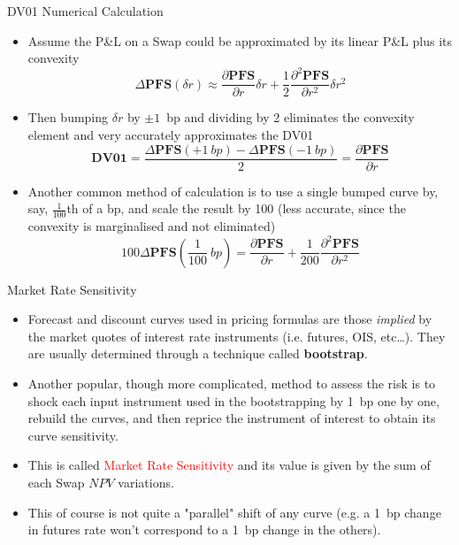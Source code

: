 \documentclass{beamer}
\begin{document}

\begin{frame}{DV01 Numerical Calculation}
\begin{itemize}
	\item<1-> Assume the P\&L on a Swap could be approximated by its linear P\&L plus its convexity
	\begin{equation*}
	\Delta \textbf{PFS}(\delta r)\approx \frac{\partial \textbf{PFS} }{\partial r}\delta r + \frac{1}{2}\frac{\partial^2 \textbf{PFS}}{\partial r^2}\delta r^2
	\end{equation*}
	\item<2-> Then bumping $\delta r$ by $\pm 1$~bp and dividing by 2 eliminates the convexity element and very accurately approximates the DV01
	\begin{equation*}
	\textbf{DV01} = \frac{\Delta \textbf{PFS}(+1~bp)-\Delta \textbf{PFS}(-1~bp)}{2}=\frac{\partial \textbf{PFS} }{\partial r}
	\end{equation*}
	\item<3-> Another common method of calculation is to use a single bumped curve by, say, $\frac{1}{100}$th of a bp, and scale the result by 100 (less accurate, since the convexity is marginalised and not eliminated)
	\begin{equation*}
	100\Delta \textbf{PFS}\left(\frac{1}{100}~bp\right)=\frac{\partial \textbf{PFS}}{\partial r}+\frac{1}{200}\frac{\partial^2\textbf{PFS}}{\partial r^2}
	\end{equation*}
	\end{itemize}
\end{frame}

\begin{frame}{Market Rate Sensitivity}
\begin{itemize}
	\item<1-> Forecast and discount curves used in pricing formulas are those \emph{implied} by the market quotes of interest rate instruments (i.e. futures, OIS, etc\ldots). They are usually determined through a technique called \textbf{bootstrap}.
	\item<2-> Another popular, though more complicated, method to assess the risk is to shock each input instrument used in the bootstrapping by 1~bp one by one, rebuild the curves, and then reprice the instrument of interest to obtain its curve sensitivity. 
	\item<3-> This is called \textcolor{red}{Market Rate Sensitivity} and its value is given by the sum of each Swap $NPV$ variations.
	\item<4-> This of course is not quite a "parallel" shift of any curve (e.g. a 1~bp change in futures rate won't correspond to a 1~bp change in the others).
\end{itemize}
\end{frame}
\end{document}
